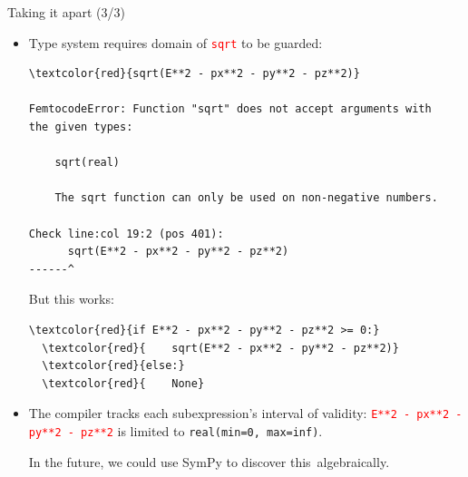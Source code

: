 \documentclass{beamer}
\begin{document}
\begin{frame}[fragile]{Taking it apart (3/3)}
\vspace{0.2 cm}
\begin{itemize}
\item Type system requires domain of \textcolor{red}{\tt sqrt} to be guarded:

\scriptsize
\begin{Verbatim}[commandchars=\\\{\}]
  \textcolor{red}{sqrt(E**2 - px**2 - py**2 - pz**2)}

FemtocodeError: Function "sqrt" does not accept arguments with
the given types:

    sqrt(real)

    The sqrt function can only be used on non-negative numbers.

Check line:col 19:2 (pos 401):
      sqrt(E**2 - px**2 - py**2 - pz**2)
------^
\end{Verbatim}

\normalsize But this works:

\scriptsize
\begin{Verbatim}[commandchars=\\\{\}]
  \textcolor{red}{if E**2 - px**2 - py**2 - pz**2 >= 0:}
  \textcolor{red}{    sqrt(E**2 - px**2 - py**2 - pz**2)}
  \textcolor{red}{else:}
  \textcolor{red}{    None}
\end{Verbatim}

\normalsize

\item The compiler tracks each subexpression's interval of validity: \textcolor{red}{\tt\scriptsize E**2 - px**2 - py**2 - pz**2} is limited to \mbox{{\tt\scriptsize real(min=0, max=inf)}.\hspace{-1 cm}}

\vspace{0.2 cm}
In the future, we could use SymPy to discover \mbox{this algebraically.\hspace{-1 cm}}
\end{itemize}
\end{frame}
\end{document}
